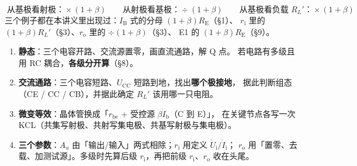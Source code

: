 \documentclass[11pt]{ctexart}
\begin{document}

\[
\boxed{\;\text{从基极看射极：}\times(1+\beta)\qquad
\text{从射极看基极：}\div(1+\beta)\qquad
\text{从基极看负载 }R_L'\text{：}\times(1+\beta)\;}
\]
三个例子都在本讲义里出现过：$I_{\mathrm{B}}$ 式的分母 $(1+\beta)R_{\mathrm{E}}$（§1）、
$r_{\mathrm{i}}$ 里的 $(1+\beta)R_L'$（§3）、$r_{\mathrm{o}}$ 里的 $\div(1+\beta)$（§3）、
E1 的 $(1+\beta)R_{\mathrm{E}}$（§9）。


\begin{enumerate}
\item \textbf{静态}：三个电容开路、交流源置零，画直流通路，解 Q 点。
若电路有多级且用 RC 耦合，\textbf{各级分开算}（§8）。
\item \textbf{交流通路}：三个电容短路、$U_{\mathrm{CC}}$ 短路到地，找出\textbf{哪个极接地}，
据此判断组态（CE / CC / CB），并据此确定 $R_L'$ 该用哪一只电阻。
\item \textbf{微变等效}：晶体管换成「$r_{\mathrm{be}}$ + 受控源 $\beta\dot I_{\mathrm{b}}$（C 到 E）」，
在关键节点各写一次 KCL（共集写射极、共射写集电极、共基写射极与集电极）。
\item \textbf{三个参数}：$A_u$ 由「输出/输入」两式相除；$r_{\mathrm{i}}$ 用定义 $\dot U_{\mathrm{i}}/\dot I_{\mathrm{i}}$；
$r_{\mathrm{o}}$ 用「置零、去载、加测试源」。多级时先算后级 $r_{\mathrm{i}}$，再把前级 $r_{\mathrm{i}}$、$r_{\mathrm{o}}$ 收在头尾。
\end{enumerate}


\end{document}
